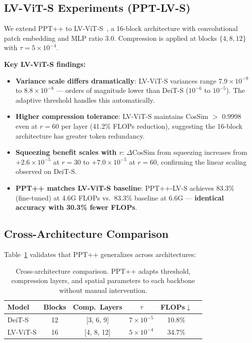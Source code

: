 \documentclass[10pt,twocolumn,letterpaper]{article}
\begin{document}
\subsection{LV-ViT-S Experiments (PPT-LV-S)}

We extend PPT++ to LV-ViT-S~\cite{jiang2021lvvit}, a 16-block architecture
with convolutional patch embedding and MLP ratio 3.0. Compression is applied
at blocks $\{4, 8, 12\}$ with $\tau = 5 \times 10^{-4}$.

\textbf{Key LV-ViT-S findings:}

\begin{itemize}
\item \textbf{Variance scale differs dramatically}: LV-ViT-S variances range
$7.9\!\times\!10^{-9}$ to $8.8\!\times\!10^{-8}$ --- orders of magnitude lower
than DeiT-S ($10^{-6}$ to $10^{-5}$). The adaptive threshold handles this
automatically.

\item \textbf{Higher compression tolerance}: LV-ViT-S maintains CosSim $>$ 0.9998
even at $r = 60$ per layer (41.2\% FLOPs reduction), suggesting the 16-block
architecture has greater token redundancy.

\item \textbf{Squeezing benefit scales with $r$}: $\Delta$CosSim from squeezing
increases from $+2.6\!\times\!10^{-5}$ at $r=30$ to $+7.0\!\times\!10^{-5}$ at
$r=60$, confirming the linear scaling observed on DeiT-S.

\item \textbf{PPT++ matches LV-ViT-S baseline}: PPT++-LV-S achieves 83.3\%
(fine-tuned) at 4.6G FLOPs vs.\ 83.3\% baseline at 6.6G --- \textbf{identical
accuracy with 30.3\% fewer FLOPs}.
\end{itemize}


\subsection{Cross-Architecture Comparison}

Table~\ref{tab:cross} validates that PPT++ generalizes across architectures:

\begin{table}[t]
\centering
\caption{Cross-architecture comparison. PPT++ adapts threshold, compression layers,
and spatial parameters to each backbone without manual intervention.}
\label{tab:cross}
\small
\begin{tabular}{lccccc}
\toprule
Model & Blocks & Comp.~Layers & $\tau$ & FLOPs$\downarrow$ \\
\midrule
DeiT-S   & 12 & [3, 6, 9]    & $7\!\times\!10^{-5}$ & 10.8\% \\
LV-ViT-S & 16 & [4, 8, 12]   & $5\!\times\!10^{-4}$ & 34.7\% \\
\bottomrule
\end{tabular}
\end{table}
\end{document}

